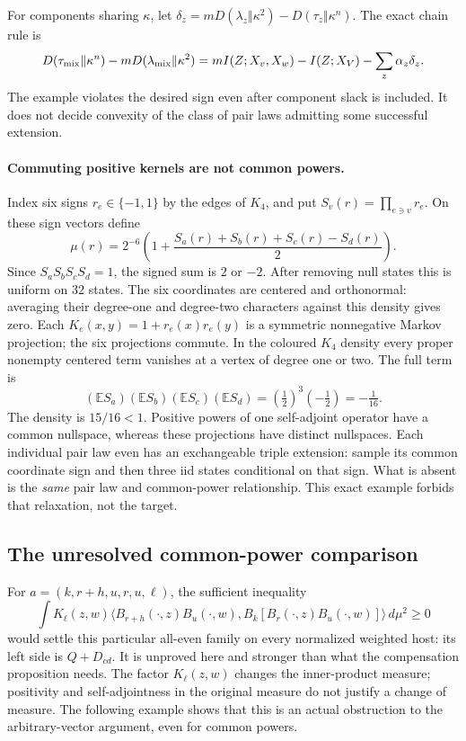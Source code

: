 For components sharing $\kappa$, let
$\delta_z=mD(\lambda_z\Vert\kappa^2)-D(\tau_z\Vert\kappa^n)$.
The exact chain rule is
\[
 D(\tau_{\rm mix}\Vert\kappa^n)-mD(\lambda_{\rm mix}\Vert\kappa^2)
 =mI(Z;X_v,X_w)-I(Z;X_V)-\sum_z\alpha_z\delta_z.
\]
The example violates the desired sign even after component slack is included.
It does not decide convexity of the class of pair laws admitting some
successful extension.

\paragraph{Commuting positive kernels are not common powers.}
Index six signs $r_e\in\{-1,1\}$ by the edges of $K_4$, and put
$S_v(r)=\prod_{e\ni v}r_e$.
On these sign vectors define
\[
 \mu(r)=2^{-6}\left(1+\frac{S_a(r)+S_b(r)+S_c(r)-S_d(r)}2\right).
\]
Since $S_aS_bS_cS_d=1$, the signed sum is $2$ or $-2$.
After removing null states this is uniform on $32$ states.
The six coordinates are centered and orthonormal: averaging their
degree-one and degree-two characters against this density gives zero.
Each $K_e(x,y)=1+r_e(x)r_e(y)$ is a symmetric nonnegative Markov
projection; the six projections commute.
In the coloured $K_4$ density every proper nonempty centered term
vanishes at a vertex of degree one or two.  The full term is
\[
 (\mathbb E S_a)(\mathbb E S_b)(\mathbb E S_c)(\mathbb E S_d)
 =(\tfrac12)^3(-\tfrac12)=-\tfrac1{16}.
\]
The density is $15/16<1$.
Positive powers of one self-adjoint operator have a common nullspace,
whereas these projections have distinct nullspaces.
Each individual pair law even has an exchangeable triple extension:
sample its common coordinate sign and then three iid states conditional
on that sign.  What is absent is the \emph{same} pair law and common-power
relationship.  This exact example forbids that relaxation, not the target.

\subsection{The unresolved common-power comparison}

For $a=(k,r+h,u,r,u,\ell)$, the sufficient inequality
\[
 \int K_\ell(z,w)\langle
 B_{r+h}(\cdot,z)B_u(\cdot,w),
 B_k[B_r(\cdot,z)B_u(\cdot,w)]\rangle\,d\mu^2\geq0
\]
would settle this particular all-even family on every normalized weighted
host: its left side is $Q+D_{cd}$.
It is unproved here and stronger than what the compensation proposition
needs.  The factor $K_\ell(z,w)$ changes the inner-product measure;
positivity and self-adjointness in the original measure do not justify
a change of measure.  The following example shows that this is an actual
obstruction to the arbitrary-vector argument, even for common powers.

